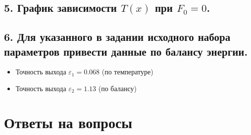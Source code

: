 \documentclass[a4paper,oneside,12pt]{extreport}
\begin{document}
\newpage

\begin{figure}[ht!]
\end{figure}

\subsection{5. График зависимости $T(x)$ при $F_{0} = 0$.}

\begin{figure}[ht!]
\end{figure}

\subsection{6. Для указанного в задании исходного набора параметров привести данные по балансу энергии.}

\begin{itemize}
	\item Точность выхода $\varepsilon_{1} = 0.068$ (по температуре)
	\item Точность выхода $\varepsilon_{2} = 1.13$ (по балансу)
\end{itemize}

\newpage
\section{Ответы на вопросы}
\end{document}
